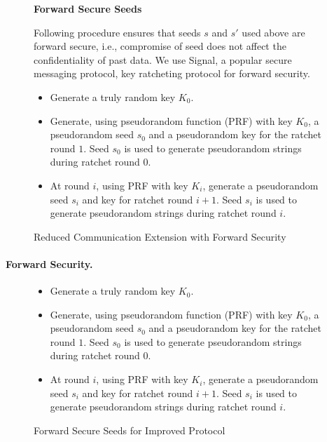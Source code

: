 \begin{figure}[h]
\begin{mdframed}[style=myframe]
\textbf{Forward Secure Seeds}
\vspace{4pt}

Following procedure ensures that seeds $s$ and $s'$ used above are forward
	secure, i.e., compromise of seed does not affect the confidentiality of past
	data. We use Signal, a popular secure messaging protocol, key ratcheting
	protocol for forward security.

\begin{itemize}[leftmargin=*]

	\item Generate a truly random key $K_0$.

	\item Generate, using pseudorandom function (PRF) with key $K_0$, a
		pseudorandom seed $s_0$ and a pseudorandom key for the ratchet round $1$.
		Seed $s_0$ is used to generate pseudorandom strings during ratchet round
		$0$.

	\item At round $i$, using PRF with key $K_i$, generate a pseudorandom seed
		$s_i$ and key for ratchet round $i+1$. Seed $s_i$ is used to generate
		pseudorandom strings during ratchet round $i$.



\end{itemize}

\end{mdframed}
\caption{Reduced Communication Extension with Forward Security}
\label{fig:basicprotocol}
\end{figure}

\paragraph{Forward Security.}

\begin{figure}[h]
\begin{mdframed}[style=myframe]

\begin{itemize}[leftmargin=*]

		\item Generate a truly random key $K_0$.

		\item Generate, using pseudorandom function (PRF) with key $K_0$, a
			pseudorandom seed $s_0$ and a pseudorandom key for the ratchet round $1$.
			Seed $s_0$ is used to generate pseudorandom strings during ratchet round
			$0$.

		\item At round $i$, using PRF with key $K_i$, generate a pseudorandom seed
			$s_i$ and key for ratchet round $i+1$. Seed $s_i$ is used to generate
			pseudorandom strings during ratchet round $i$.

\end{itemize}

\end{mdframed}
\caption{Forward Secure Seeds for Improved Protocol}
\label{fig:basicprotocol}
\end{figure}

